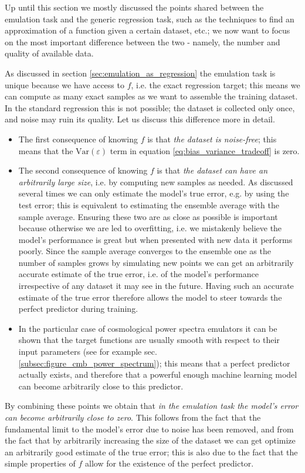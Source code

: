 Up until this section we mostly discussed the points shared between the emulation task and the generic regression task, such as the techniques to find an approximation of a function given a certain dataset, etc.; we now want to focus on the most important difference between the two - namely, the number and quality of available data.

As discussed in section \ref{sec:emulation_as_regression} the emulation task is unique because we have access to $f$, i.e. the exact regression target; this means we can compute as many exact samples as we want to assemble the training dataset. In the standard regression this is not possible; the dataset is collected only once, and noise may ruin its quality. Let us discuss this difference more in detail.

\begin{itemize}
    \item The first consequence of knowing $f$ is that \emph{the dataset is noise-free}; this means that the $\mathrm{Var}(\varepsilon)$ term in equation \eqref{eq:bias_variance_tradeoff} is zero.
    \item The second consequence of knowing $f$ is that \emph{the dataset can have an arbitrarily large size}, i.e. by computing new samples as needed. As discussed several times we can only estimate the model's true error, e.g. by using the test error; this is equivalent to estimating the ensemble average with the sample average. Ensuring these two are as close as possible is important because otherwise we are led to overfitting, i.e. we mistakenly believe the model's performance is great but when presented with new data it performs poorly. Since the sample average converges to the ensemble one as the number of samples grows by simulating new points we can get an arbitrarily accurate estimate of the true error, i.e. of the model's performance irrespective of any dataset it may see in the future. Having such an accurate estimate of the true error therefore allows the model to steer towards the perfect predictor during training.
    \item In the particular case of cosmological power spectra emulators it can be shown that the target functions are usually smooth with respect to their input parameters (see for example sec. \ref{subsec:figure_cmb_power_spectrum}); this means that a perfect predictor actually exists, and therefore that a powerful enough machine learning model can become arbitrarily close to this predictor.
\end{itemize}
By combining these points we obtain that \emph{in the emulation task the model's error can become arbitrarily close to zero}. This follows from the fact that the fundamental limit to the model's error due to noise has been removed, and from the fact that by arbitrarily increasing the size of the dataset we can get optimize an arbitrarily good estimate of the true error; this is also due to the fact that the simple properties of $f$ allow for the existence of the perfect predictor.

